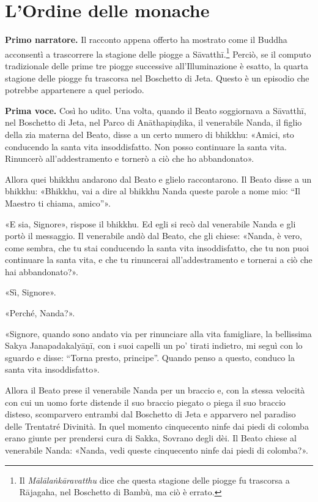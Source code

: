 \chapter{L'Ordine delle monache}

\textbf{Primo narratore.} Il racconto appena offerto ha mostrato come il Buddha
acconsentì a trascorrere la stagione delle piogge a
Sāvatthī.\footnote{Il \emph{Mālālaṅkāravatthu} dice che questa stagione delle piogge fu trascorsa a Rājagaha, nel Boschetto di Bambù, ma ciò è errato.} Perciò,
se il computo tradizionale delle
prime tre piogge successive all’Illuminazione è esatto, la quarta
stagione delle piogge fu trascorsa nel Boschetto di Jeta. Questo è un
episodio che potrebbe appartenere a quel periodo.


\textbf{Prima voce.} Così ho udito. Una volta, quando il Beato soggiornava a
Sāvatthī, nel Boschetto di Jeta, nel Parco di Anāthapiṇḍika, il
venerabile Nanda, il figlio della zia materna del Beato, disse a un
certo numero di bhikkhu: «Amici, sto conducendo la santa vita
insoddisfatto. Non posso continuare la santa vita. Rinuncerò
all’addestramento e tornerò a ciò che ho abbandonato».


Allora quei bhikkhu andarono dal Beato e glielo raccontarono. Il Beato
disse a un bhikkhu: «Bhikkhu, vai a dire al bhikkhu Nanda queste parole
a nome mio: “Il Maestro ti chiama, amico”».


«E sia, Signore», rispose il bhikkhu. Ed egli si recò dal venerabile
Nanda e gli portò il messaggio. Il venerabile andò dal Beato, che gli
chiese: «Nanda, è vero, come sembra, che tu stai conducendo la santa
vita insoddisfatto, che tu non puoi continuare la santa vita, e che tu
rinuncerai all’addestramento e tornerai a ciò che hai abbandonato?».


«Sì, Signore».


«Perché, Nanda?».


«Signore, quando sono andato via per rinunciare alla vita famigliare, la
bellissima Sakya Janapadakalyāṇī, con i suoi capelli un po’ tirati
indietro, mi seguì con lo sguardo e disse: “Torna presto, principe”.
Quando penso a questo, conduco la santa vita insoddisfatto».


Allora il Beato prese il venerabile Nanda per un braccio e, con la
stessa velocità con cui un uomo forte distende il suo braccio piegato o
piega il suo braccio disteso, scomparvero entrambi dal Boschetto di Jeta
e apparvero nel paradiso delle Trentatré Divinità. In quel momento
cinquecento ninfe dai piedi di colomba erano giunte per prendersi cura
di Sakka, Sovrano degli dèi. Il Beato chiese al venerabile Nanda:
«Nanda, vedi queste cinquecento ninfe dai piedi di colomba?».


